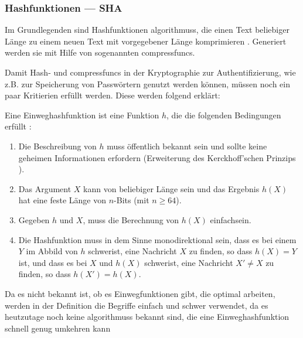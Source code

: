 \subsubsection[Hashfunktionen]{Hashfunktionen — \acf{SHA}}\label{subsubsec:hash-funktion}
Im Grundlegenden sind Hashfunktionen \glspl{algorithmus}, die einen Text beliebiger Länge zu einem neuen Text mit vorgegebener Länge komprimieren \autocite[\pagef~15]{anal_des_hash_function_2003}. Generiert werden sie mit Hilfe von sogenannten \glspl{compressfunc}.

Damit Hash- und \glspl{compressfunc} in der Kryptographie zur Authentifizierung, wie z.B. zur Speicherung von Passwörtern genutzt werden können, müssen noch ein paar Kritierien erfüllt werden. Diese werden folgend erklärt:

\begin{definition}
    Eine Einweghashfunktion ist eine Funktion $h$, die die folgenden Bedingungen erfüllt \autocite[\pagef~17]{anal_des_hash_function_2003}:    
    \begin{enumerate}
        \item Die Beschreibung von $h$ muss öffentlich bekannt sein und sollte keine geheimen Informationen erfordern (Erweiterung des Kerckhoff'schen Prinzips \autocite[]{petitcolas_information_nodate}).
        \item Das Argument $X$ kann von beliebiger Länge sein und das Ergebnis $h(X)$ hat eine feste Länge von $n$-Bits (mit $n \geq64$).
        \item Gegeben $h$ und $X$, muss die Berechnung von $h(X)$ einfach\footnotemark sein.
        \item Die Hashfunktion muss in dem Sinne monodirektional sein, dass es bei einem $Y$ im Abbild von $h$ schwer\footnotemark[\value{footnote}] ist, eine Nachricht $X$ zu finden, so dass $h(X)=Y$ ist, und dass es bei $X$ und $h(X)$ schwer\footnotemark[\value{footnote}] ist, eine Nachricht $X'\neq X$ zu finden, so dass $h(X') = h(X)$.
    \end{enumerate}
\end{definition}

Da es nicht bekannt ist, ob es Einwegfunktionen gibt, die optimal arbeiten, werden in der Definition die Begriffe einfach und schwer verwendet, da es heutzutage noch keine \glspl{algorithmus} bekannt sind, die eine Einweghashfunktion schnell genug umkehren kann \autocite[\pagef~234]{buchmann_einfuhrung_2016}

